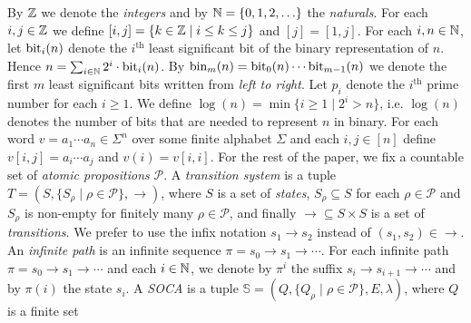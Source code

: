 \documentclass[times,envcountsame]{llncs}
\def\PSPACE{{\mathsf{PSPACE}}}
\newcommand{\prop}{\rho}
\renewcommand{\L}{\mathsf{LOGSPACE}}
\newcommand{\add}[1]{\ensuremath{\mathsf{add}(#1)}}
\newcommand{\trace}{\ensuremath{\tau}}
\newcommand{\Soca}{\mathbb{S}}
\begin{document}
\newcommand{\Prop}{\mathcal{P}}
\newcommand{\Op}{\text{Op}}
\renewcommand{\A}{\mathbb{A}}


By $\mathbb{Z}$ we denote the {\em integers} and by $\mathbb{N}=\{0,1,2,\ldots\}$ the {\em naturals}.
For each $i,j\in\mathbb{Z}$ we define $[i,j]=\{k\in\mathbb{Z}\mid i\leq k\leq j\}$ and $[j]=[1,j]$.
For each $i,n\in\mathbb{N}$, let $\text{bit}_i(n)$ denote the $i^{\text{th}}$ least significant bit of
the binary representation of $n$. Hence $n=\sum_{i\in\mathbb{N}}2^i\cdot\text{bit}_i(n)$.
By $\text{bin}_m(n)=\text{bit}_0(n)\cdots \text{bit}_{m-1}(n)$ we denote the first $m$ least significant
bits written from {\em left to right}.
Let $p_i$ denote the $i^{\text{th}}$ prime number for each $i\geq 1$.
We define $\log(n)=\min\{i\ge 1 \mid 2^i> n\}$, i.e.
$\log(n)$ denotes the number of bits that are needed to represent $n$ in
binary.
For each word $v=a_1\cdots a_n\in\Sigma^n$ over some finite alphabet $\Sigma$
and each $i,j\in[n]$ define $v[i,j]=a_i\cdots a_j$ and
$v(i)=v[i,i]$.
For the rest of the paper, we fix a countable set of {\em atomic propositions} $\Prop$.
A {\em transition system} is a tuple $T=(S,\{S_\prop\mid \prop\in\Prop\},\rightarrow)$, where
$S$ is a set of {\em states}, $S_\prop\subseteq S$ for each $\prop\in\Prop$ and
$S_\prop$ is
non-empty for finitely many $\prop\in\Prop$, and finally
$\rightarrow \subseteq S\times S$ is a set of {\em transitions}.
We prefer to use the infix notation $s_1\rightarrow s_2$ instead of
$(s_1,s_2)\in\rightarrow$.
 An {\em infinite path} is an infinite sequence
$\pi=s_0\rightarrow s_1\rightarrow \cdots$.
For each infinite path
$\pi= s_0\rightarrow s_1 \rightarrow \cdots$ and each
$i\in\mathbb{N}$, we denote by $\pi^i$ the suffix $s_i\rightarrow
s_{i+1}\rightarrow\cdots$
and by $\pi(i)$ the state $s_i$.
A {\em SOCA} is a tuple
 $\Soca=(Q,\{Q_\prop\mid \prop\in\Prop\},E,\lambda)$, where $Q$ is a finite set
\end{document}
